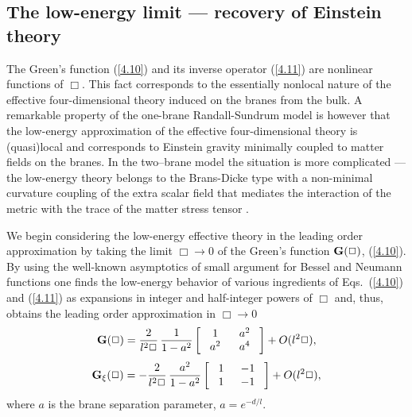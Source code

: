 \documentclass[a4paper,preprint,nofootinbib,
                 showpacs,preprintnumbers,amsmath,amssymb]{revtex4}
\begin{document}
\subsection{The low-energy limit --- recovery of Einstein theory} 
 
The Green's function (\ref{4.10}) and its inverse operator 
(\ref{4.11}) are nonlinear functions of $\Box$.  This fact corresponds to the 
essentially nonlocal nature of the effective four-dimensional theory induced 
on the branes from the bulk. A remarkable property of the one-brane 
Randall-Sundrum model is however that the low-energy approximation of the 
effective four-dimensional theory is (quasi)local and corresponds to Einstein 
gravity minimally coupled to matter fields on the branes. In the two--brane 
model the situation is more complicated --- the low-energy theory belongs to 
the Brans-Dicke type with a non-minimal curvature coupling of the extra scalar 
field that mediates the interaction of the metric with the trace of the matter 
stress tensor \cite{GT}. 
 
We begin considering the low-energy effective theory in the 
leading order approximation by taking the limit $\Box\to 0$ of the 
Green's function ${\bf G}(\Box)$, (\ref{4.10}).  By using the 
well-known asymptotics of small argument for Bessel and Neumann 
functions one finds the low-energy behavior of various ingredients 
of Eqs.~(\ref{4.10}) and (\ref{4.11}) as expansions in integer and 
half-integer powers of $\Box$ and, thus, obtains the leading order  
approximation in $\Box\to 0$ 
    \begin{equation} 
    {\bf G}(\Box)=\frac2{l^2\Box}\,\frac1{1-a^2} 
    \left[\begin{array}{cc} 
    \,\,1\,\,&\,\,a^2\,\, \\ 
    \,\,a^2\,\, &\,\,a^4\,\, 
    \end{array}\right]+O(l^2\Box),                               \label{4.12} 
    \end{equation} 
    \begin{equation} 
    {\bf G}_\xi(\Box)=-\frac2{l^2\Box}\,\frac{a^2}{1-a^2} 
    \left[\begin{array}{cc} 
    \,\,1\,\,&\,-1\,\, \\ 
    \,\,1\,\,&\,-1\,\, 
    \end{array}\right]+O(l^2\Box),                \label{4.13} 
    \end{equation} 
where $a$ is the brane separation parameter, $a=e^{-d/l}$. 
 
\end{document}
